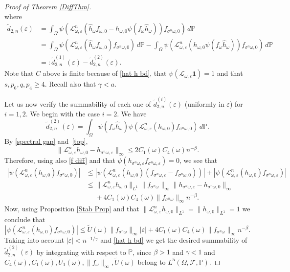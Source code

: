 \documentclass[11pt,reqno,a4paper]{article}
\theoremstyle{special}
\def\om{\omega}
\begin{document}
\begin{proof}[Proof of Theorem \ref{DiffThm}]
$$$$
where 
\[
\begin{split}
\tilde d_{2,n}(\varepsilon) &=\int_\Omega \psi(\mathcal L_{\om, \varepsilon}^n(\hat h_\om f_{\om, 0}-h_{\om, 0}\psi(f_\om \hat h_\om))f_{\sigma^n\om, 0})\, d\mathbb P \\
&=\int_\Omega \psi(\mathcal L_{\om, \varepsilon}^n(\hat h_\om f_{\om, 0})f_{\sigma^n\om, 0})\, d\mathbb P-\int_\Omega \psi(\mathcal L_{\om, \varepsilon}^n(h_{\om, 0}\psi(f_\om \hat h_\om))f_{\sigma^n\om, 0})\, d\mathbb P \\
&=:\tilde d^{(1)}_{2,n}(\varepsilon)-\tilde d^{(2)}_{2,n}(\varepsilon).
\end{split}
\]
Note that $C$ above is finite because of \eqref{hat h bd}, that $\psi(\mathcal L_{\om,\varepsilon}\textbf{1})=1$ and that $s,p_6,q,p_4\geq 4$. Recall also that $\gamma<a$.

Let us now verify the summability of each one of $\tilde d_{2,n}^{(i)}(\varepsilon)$ (uniformly in $\varepsilon$) for $i=1,2$.
We begin with the case $i=2$. We have 
$$
\tilde d^{(2)}_{2,n}(\varepsilon)=
\int_\Omega\psi(f_\om \hat h_\om) \psi(\mathcal L_{\om, \varepsilon}^n(h_{\om, 0})f_{\sigma^n\om, 0})\, d\mathbb P.
$$
By \eqref{spectral gap} and~\eqref{top},
$$
\|\mathcal L_{\om,\varepsilon}^n h_{\om, 0}-h_{\sigma^n\om, \varepsilon}\|_\infty \leq 2C_1(\om)C_4(\om)n^{-\beta}.
$$
Therefore, using also \eqref{f diff} and that $\psi(h_{\sigma^n \om, \varepsilon}f_{\sigma^n \om, \varepsilon})=0$, we see that 
\[
\begin{split}
\left|\psi(\mathcal L_{\om, \varepsilon}^n(h_{\om, 0})f_{\sigma^n\om, 0})\right| &\leq 
\left|\psi(\mathcal L_{\om, \varepsilon}^n(h_{\om, 0})(f_{\sigma^n\om, \varepsilon}-f_{\sigma^n\om, 0}))\right| 
+\left|\psi(\mathcal L_{\om, \varepsilon}^n(h_{\om, 0})f_{\sigma^n\om, \varepsilon})\right| \\
&\leq \|\mathcal L_{\om, \varepsilon}^n h_{\om, 0}\|_{L^1}\|f_{\sigma^n\om}\|_\infty\|h_{\sigma^n \om, \varepsilon}-h_{\sigma^n \om, 0}\|_\infty  \\
&\phantom{\leq}+4C_1(\om)C_4(\om)\|f_{\sigma^n \om}\|_\infty n^{-\beta}.
\end{split}
\]
Now, using Proposition \ref{Stab Prop} and that $\|\mathcal L_{\om, \varepsilon}^n h_{\om, 0}\|_{L^1}=\|h_{\om, 0}\|_{L^1}=1$ we conclude that 
$$
\left|\psi(\mathcal L_{\om, \varepsilon}^n(h_{\om, 0})f_{\sigma^n\om, 0})\right| \leq  \tilde U(\om)\|f_{\sigma^n\om}\|_\infty|\varepsilon|+ 4C_1(\om)C_4(\om)\|f_{\sigma^n \om}\|_\infty n^{-\beta}.
$$
Taking into account $|\varepsilon|<n^{-1/\gamma}$ and \eqref{hat h bd} we get the desired summability  of $\tilde d_{2,n}^{(2)}(\varepsilon)$ by integrating with respect to $\mathbb P$,
since $\beta>1$ and $\gamma<1$ and $C_4(\om), C_1(\om), U_1(\om), \|f_\om\|_\infty, \tilde U(\om)$ belong to $L^5(\Omega,\mathcal F,\mathbb P)$. 




\end{proof}
\end{document}
